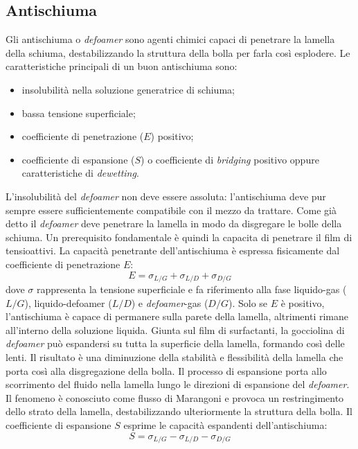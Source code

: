 \subsection{Antischiuma}
Gli antischiuma o \textit{defoamer} sono agenti chimici capaci di penetrare la lamella della schiuma, destabilizzando la struttura della bolla per farla così esplodere. Le caratteristiche principali di un buon antischiuma sono:
\begin{itemize}
    \item insolubilità nella soluzione generatrice di schiuma;
    \item bassa tensione superficiale;
    \item coefficiente di penetrazione (\(E\)) positivo;
    \item coefficiente di espansione (\(S\)) o coefficiente di \textit{bridging} positivo oppure caratteristiche di \textit{dewetting}.
\end{itemize}

L'insolubilità del \textit{defoamer} non deve essere assoluta: l'antischiuma deve pur sempre essere sufficientemente compatibile con il mezzo da trattare. 
Come già detto il \textit{defoamer} deve penetrare la lamella in modo da disgregare le bolle della schiuma. Un prerequisito fondamentale è quindi la capacita di penetrare il film di tensioattivi. La capacità penetrante dell'antischiuma è espressa fisicamente dal coefficiente di penetrazione \(E\):
\[E = \sigma_{L/G} + \sigma_{L/D} + \sigma_{D/G} \label{eq:penetration} \]
dove \(\sigma\) rappresenta la tensione superficiale e fa riferimento alla fase liquido-gas (\(L/G\)), liquido-defoamer (\(L/D\)) e \textit{defoamer}-gas (\(D/G\)). Solo se \(E\) è positivo, l'antischiuma è capace di permanere sulla parete della lamella, altrimenti rimane all'interno della soluzione liquida. Giunta sul film di surfactanti,  la gocciolina di \textit{defoamer} può espandersi su tutta la superficie della lamella, formando così delle lenti. Il risultato è una diminuzione della stabilità e flessibilità della lamella che porta così alla disgregazione della bolla. Il processo di espansione porta allo scorrimento del fluido nella lamella lungo le direzioni di espansione del \textit{defoamer}. Il fenomeno è conosciuto come flusso di Marangoni e provoca un restringimento dello strato della lamella, destabilizzando ulteriormente la struttura della bolla. Il coefficiente di espansione \(S\) esprime le capacità espandenti dell'antischiuma:
\[S = \sigma_{L/G} - \sigma_{L/D} - \sigma_{D/G} \label{eq:spreading} \]

